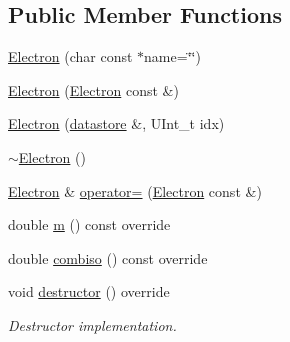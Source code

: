 \subsection*{Public Member Functions}
\begin{DoxyCompactItemize}
\item 
\hyperlink{classpanda_1_1Electron_acfc2bc09ae177948fc6eef2e4d59946e}{Electron} (char const $\ast$name=\char`\"{}\char`\"{})
\item 
\hyperlink{classpanda_1_1Electron_af840b7a8130fbf43c745ebfc6f823d01}{Electron} (\hyperlink{classpanda_1_1Electron}{Electron} const \&)
\item 
\hyperlink{classpanda_1_1Electron_ac799df2aad67e3d34c3d71bc6848cc91}{Electron} (\hyperlink{structpanda_1_1Element_1_1datastore}{datastore} \&, UInt\_\-t idx)
\item 
\hyperlink{classpanda_1_1Electron_a279592af2591ccab5cf7e6d4527dcb56}{$\sim$Electron} ()
\item 
\hyperlink{classpanda_1_1Electron}{Electron} \& \hyperlink{classpanda_1_1Electron_adf667b212f1ea11094dd276fd913c4f6}{operator=} (\hyperlink{classpanda_1_1Electron}{Electron} const \&)
\item 
double \hyperlink{classpanda_1_1Electron_a809cee4161783ff5d00b69e24c125759}{m} () const override
\item 
double \hyperlink{classpanda_1_1Electron_a68eb50798d64b6bafaa21aac9e67f0d6}{combiso} () const override
\item 
void \hyperlink{classpanda_1_1Electron_a9e9a34d904d5cc02ab895e73cdaf6d7f}{destructor} () override
\begin{DoxyCompactList}\small\item\em Destructor implementation. \item\end{DoxyCompactList}\end{DoxyCompactItemize}
